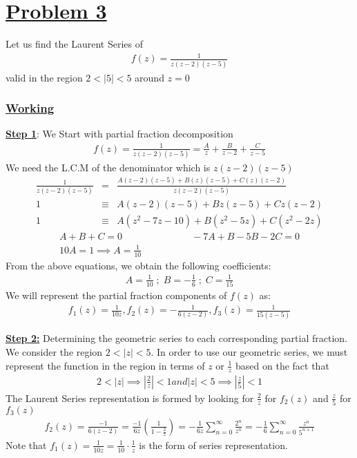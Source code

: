 \documentclass[11pt]{report}
\newcommand{\ubt}[1]{\textbf{\underline{#1}}}
\newcommand{\sps}{\\[0.2cm]}
\newcommand{\dsp}{\displaystyle}
\newcommand{\NI}{\noindent}
\newcommand{\problem}[1]{\section*{\ubt{Problem #1}}}
\newcommand{\working}{\subsubsection{\ubt{Working}}}
\begin{document}
	
	\problem{3}
	Let us find the Laurent Series of
	\begin{eqnarray*}
		f(z) = \frac{1}{z(z-2)(z-5)}
	\end{eqnarray*}
	valid in the region $2 < |5|<5$ around $z=0$
	
	\working
	\ubt{Step 1}: We Start with partial fraction decomposition
	\begin{eqnarray*}
		f(z) = \frac{1}{z(z-2)(z-5)} = \frac{A}{z}+ \frac{B}{z-2} + \frac{C}{z-5}
	\end{eqnarray*}
	We need the L.C.M of the denominator which is $z(z-2)(z-5)$
	\begin{eqnarray*}
		\frac{1}{z(z-2)(z-5)}  &=& \frac{A(z-2)(z-5)+B(z)(z-5)+C(z)(z-2)}{z(z-2)(z-5)}\sps
		1 &\equiv& A(z-2)(z-5)+Bz(z-5)+Cz(z-2)\sps
		1 &\equiv& A(z^2-7z-10) + B(z^2-5z) + C(z^2-2z)
	\end{eqnarray*}
	\begin{gather*}
		A+B+C= 0\hspace{3cm} -7A + B - 5B - 2C = 0\sps
		10A = 1 \implies A = \frac{1}{10}
	\end{gather*}
	From the above equations, we obtain the following coefficients:
	\begin{eqnarray*}
		A = \frac{1}{10}\; ; \; B =-\frac{1}{6}\; ; \; C =\frac{1}{15}
	\end{eqnarray*}
	We will represent the partial fraction components of $f(z)$ as:
	\begin{eqnarray*}
		f_1(z) = \frac{1}{10z}, f_2(z) = -\frac{1}{6(z-2)}, f_3(z) = \frac{1}{15(z-5)}
	\end{eqnarray*}
	
	\NI\ubt{Step 2:} Determining the geometric series to each corresponding partial fraction.\\
	
	\NI We consider the region $2<|z|<5$. In order to use our geometric series, we must represent the function in the region in terms of $z$ or $\dsp\frac{1}{z}$ based on the fact that
	\begin{eqnarray*}
		2 < |z| \implies \left|\frac{2}{z}\right| < 1 and |z| < 5 \implies\left|\frac{z}{5}\right| < 1
	\end{eqnarray*}
	The Laurent Series representation is formed by looking for $\dsp\frac{2}{z}$ for $f_2(z)$ and $\dsp\frac{z}{5}$ for $f_3(z)$
	\begin{eqnarray*}
		f_2(z) = \frac{-1}{6(z-2)} = \frac{-1}{6z}\left(\frac{1}{1-\frac{2}{z}}\right) = -\frac{1}{6z}\sum_{n=0}^{\infty}\frac{2^n}{z^n}=-\frac{1}{6}\sum_{n=0}^{\infty}\frac{z^n}{5^{n+1}}
	\end{eqnarray*}
	Note that $\dsp f_1(z)=\frac{1}{10z} = \frac{1}{10}\cdot \frac{1}{z}$ is the form of series representation.\\
	
\end{document}
